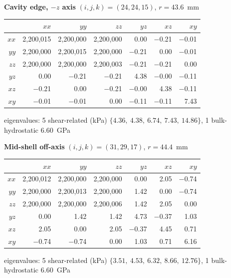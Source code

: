 \documentclass[11pt,letterpaper]{article}
\begin{document}
\textbf{Cavity edge, $-z$ axis} \quad $(i,j,k)=(24,24,15)$, $r=43.6$~mm
\begin{center}\scriptsize
\begin{tabular}{r|rrrrrr}
\toprule
 & $xx$ & $yy$ & $zz$ & $yz$ & $xz$ & $xy$ \\
\midrule
$xx$ & \phantom{$-$}2,200,015 & \phantom{$-$}2,200,000 & \phantom{$-$}2,200,000 & \phantom{$-$}0.00 & $-$0.21 & $-$0.01 \\
$yy$ & \phantom{$-$}2,200,000 & \phantom{$-$}2,200,015 & \phantom{$-$}2,200,000 & $-$0.21 & \phantom{$-$}0.00 & $-$0.01 \\
$zz$ & \phantom{$-$}2,200,000 & \phantom{$-$}2,200,000 & \phantom{$-$}2,200,003 & $-$0.21 & $-$0.21 & \phantom{$-$}0.00 \\
$yz$ & \phantom{$-$}0.00 & $-$0.21 & $-$0.21 & \phantom{$-$}4.38 & $-$0.00 & $-$0.11 \\
$xz$ & $-$0.21 & \phantom{$-$}0.00 & $-$0.21 & $-$0.00 & \phantom{$-$}4.38 & $-$0.11 \\
$xy$ & $-$0.01 & $-$0.01 & \phantom{$-$}0.00 & $-$0.11 & $-$0.11 & \phantom{$-$}7.43 \\
\bottomrule
\end{tabular}
\end{center}
\vspace{-4pt}\noindent\hspace{1em}\scriptsize eigenvalues: 5 shear-related (kPa) $\{4.36,\ 4.38,\ 6.74,\ 7.43,\ 14.86\}$, 1 bulk-hydrostatic $6.60$~GPa

\textbf{Mid-shell off-axis} \quad $(i,j,k)=(31,29,17)$, $r=44.4$~mm
\begin{center}\scriptsize
\begin{tabular}{r|rrrrrr}
\toprule
 & $xx$ & $yy$ & $zz$ & $yz$ & $xz$ & $xy$ \\
\midrule
$xx$ & \phantom{$-$}2,200,012 & \phantom{$-$}2,200,000 & \phantom{$-$}2,200,000 & \phantom{$-$}0.00 & \phantom{$-$}2.05 & $-$0.74 \\
$yy$ & \phantom{$-$}2,200,000 & \phantom{$-$}2,200,013 & \phantom{$-$}2,200,000 & \phantom{$-$}1.42 & \phantom{$-$}0.00 & $-$0.74 \\
$zz$ & \phantom{$-$}2,200,000 & \phantom{$-$}2,200,000 & \phantom{$-$}2,200,006 & \phantom{$-$}1.42 & \phantom{$-$}2.05 & \phantom{$-$}0.00 \\
$yz$ & \phantom{$-$}0.00 & \phantom{$-$}1.42 & \phantom{$-$}1.42 & \phantom{$-$}4.73 & $-$0.37 & \phantom{$-$}1.03 \\
$xz$ & \phantom{$-$}2.05 & \phantom{$-$}0.00 & \phantom{$-$}2.05 & $-$0.37 & \phantom{$-$}4.45 & \phantom{$-$}0.71 \\
$xy$ & $-$0.74 & $-$0.74 & \phantom{$-$}0.00 & \phantom{$-$}1.03 & \phantom{$-$}0.71 & \phantom{$-$}6.16 \\
\bottomrule
\end{tabular}
\end{center}
\vspace{-4pt}\noindent\hspace{1em}\scriptsize eigenvalues: 5 shear-related (kPa) $\{3.51,\ 4.53,\ 6.32,\ 8.66,\ 12.76\}$, 1 bulk-hydrostatic $6.60$~GPa
\end{document}
